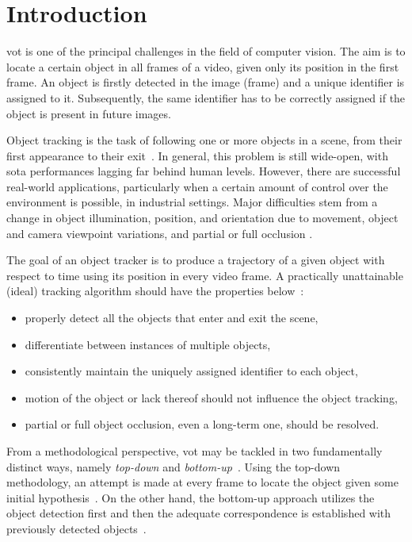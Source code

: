 \chapter{Introduction}
\label{chap:Introduction}

\Gls{vot} is one of the principal challenges in the field of computer vision. The aim is to locate a certain object in all frames of a video, given only its position in the first frame. An object is firstly detected in the image (frame) and a unique identifier is assigned to it. Subsequently, the same identifier has to be correctly assigned if the object is present in future images.

Object tracking is the task of following one or more objects in a scene, from their first appearance to their exit~\cite{forsyth2012computer}. In general, this problem is still wide-open, with \gls{sota} performances lagging far behind human levels. However, there are successful real-world applications, particularly when a certain amount of control over the environment is possible, \egtext{} in industrial settings. Major difficulties stem from a change in object illumination, position, and orientation due to movement, object and camera viewpoint variations, and partial or full occlusion \cite{jalal2012sotavot}.

The goal of an object tracker is to produce a trajectory of a given object with respect to time using its position in every video frame. A practically unattainable (ideal) tracking algorithm should have the properties below~\cite{jalal2012sotavot}:
\begin{itemize}
    \item properly detect all the objects that enter and exit the scene,
    \item differentiate between instances of multiple objects,
    \item consistently maintain the uniquely assigned identifier to each object,
    \item motion of the object or lack thereof should not influence the object tracking,
    \item partial or full object occlusion, even a long-term one, should be resolved.
\end{itemize}

From a methodological perspective, \gls{vot} may be tackled in two fundamentally distinct ways, namely \emph{top-down} and \emph{bottom-up}~\cite{jalal2012sotavot}. Using the top-down methodology, an attempt is made at every frame to locate the object given some initial hypothesis~\cite{comaniciu2003kernel}. On the other hand, the bottom-up approach utilizes the object detection first and then the adequate correspondence is established with previously detected objects~\cite{wren1997pfinder}.


